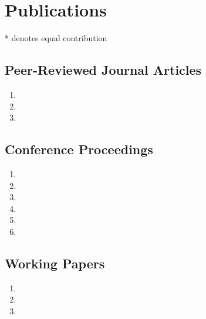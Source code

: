 \documentclass[10pt,letterpaper]{article}
\begin{document}

\section*{Publications}

* denotes equal contribution

\vspace{-0.05in}


\subsection*{Peer-Reviewed Journal Articles}

\begin{enumerate}
\item {}
\item {}
\item {}
\end{enumerate}

\subsection*{Conference Proceedings}

\begin{enumerate}[resume]
\item {}
\item {}
\item {}
\item {}
\item {}
\item {}
\end{enumerate}

\subsection*{Working Papers}
\begin{enumerate}[resume]
\item {}
\item {}
\item {}
\end{enumerate}

\vspace{-0.25in}
\end{document}
